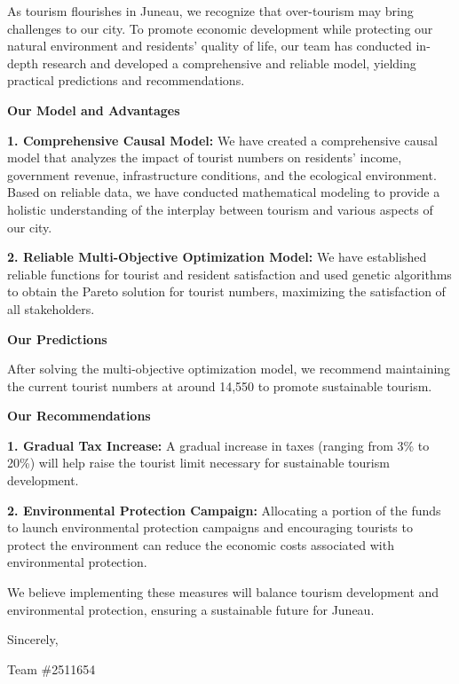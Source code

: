 \documentclass[12pt]{article}  %
\begin{document}
As tourism flourishes in Juneau, we recognize that over-tourism may bring challenges to our city. To promote economic development while protecting our natural environment and residents' quality of life, our team has conducted in-depth research and developed a comprehensive and reliable model, yielding practical predictions and recommendations.

\noindent
\textbf{Our Model and Advantages}

\textbf{1. Comprehensive Causal Model:} We have created a comprehensive causal model that analyzes the impact of tourist numbers on residents' income, government revenue, infrastructure conditions, and the ecological environment. Based on reliable data, we have conducted mathematical modeling to provide a holistic understanding of the interplay between tourism and various aspects of our city.

\textbf{2. Reliable Multi-Objective Optimization Model:} We have established reliable functions for tourist and resident satisfaction and used genetic algorithms to obtain the Pareto solution for tourist numbers, maximizing the satisfaction of all stakeholders.

\noindent
\textbf{Our Predictions}

After solving the multi-objective optimization model, we recommend maintaining the current tourist numbers at around 14,550 to promote sustainable tourism.

\noindent
\textbf{Our Recommendations}

\textbf{1. Gradual Tax Increase: }A gradual increase in taxes (ranging from 3\% to 20\%) will help raise the tourist limit necessary for sustainable tourism development.

\textbf{2. Environmental Protection Campaign: }Allocating a portion of the funds to launch environmental protection campaigns and encouraging tourists to protect the environment can reduce the economic costs associated with environmental protection.

We believe implementing these measures will balance tourism development and environmental protection, ensuring a sustainable future for Juneau.

\noindent Sincerely,

\noindent Team \#2511654
%
\end{document}
